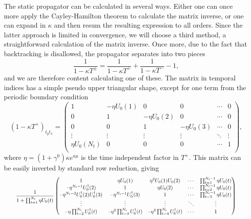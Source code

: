 The static propagator can be calculated in several ways. Either one can once
more apply the Cayley-Hamilton theorem to calculate the matrix inverse, or one
can expand in $\kappa$ and then resum the resulting expression to all orders.
Since the latter approach is limited in convergence, we will choose a third
method, a straightforward calculation of the matrix inverse. Once more, due to
the fact that backtracking is disallowed, the propagator separates into two
pieces
%
\begin{equation}
  \frac{1}{1 - \kappa T^{\pm}} = \frac{1}{1 - \kappa T^+} + \frac{1}{1 - \kappa
    T^-} -1,
\end{equation}
%
and we are therefore content calculating one of these. The matrix in temporal
indices has a simple pseudo upper triangular shape, except for one term from the
periodic boundary condition
%
\begin{equation}
  (1-\kappa T^+)_{t_y t_x} = 
  \begin{pmatrix}
    1 & \minus\eta U_0 (1) & 0 & 0 & \cdots & 0\\
    0 & 1 & \minus\eta U_0 (2) & 0 & \cdots & 0\\
    0 & 0 & 1 & \minus\eta U_0 (3) & \cdots & 0\\
    \vdots & \vdots & \vdots & \vdots & \ddots & \vdots\\
    \eta U_0 (N_t) & 0 & 0 & 0 & \cdots & 1\\
  \end{pmatrix},
\end{equation}
%
where $\eta = (1+\gamma^0)\kappa e^{a\mu}$ is the time independent factor in
$T^+$. This matrix can be easily inverted by standard row reduction, giving
%
\begin{equation}
  \scalemath{0.78}{%
  \frac{1}{1 + \prod_{t=1}^{N_t} \eta U_0(t)}
  \begin{pmatrix}
    1 & \eta U_0(1) & \eta^2 U_0(1) U_0(2) & \cdots & \prod_{t=1}^{N_t-1}\eta U_0(t)\\
    \minus\eta^{N_t-1} U^{\dagger}_0(2) & 1 & \eta U_0(2) & \cdots & \prod_{t=2}^{N_t-1}\eta U_0(t)\\
    \minus\eta^{N_t-2} U^{\dagger}_0(2) U^{\dagger}_0(3) & \minus\eta^{N_t-1}
      U^{\dagger}_0(3) & 1 & \cdots & \prod_{t=3}^{N_t-1}\eta U_0(t)\\
    \vdots  & \vdots  & \vdots  & \ddots & \vdots \\
    \minus\eta\prod_{t=2}^{N_t} U^{\dagger}_0(t) &
    \minus\eta^2\prod_{t=3}^{N_t} U^{\dagger}_0(t) &
    \minus\eta^3\prod_{t=4}^{N_t} U^{\dagger}_0(t) & \cdots & 1
  \end{pmatrix}}
\end{equation}
